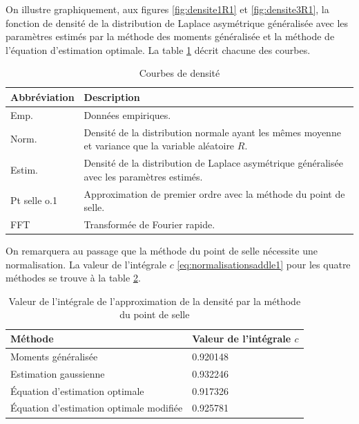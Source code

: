 On illustre graphiquement, aux figures \ref{fig:densite1R1} et
\ref{fig:densite3R1}, la fonction de densité de la distribution de
Laplace asymétrique généralisée avec les paramètres estimés par la
méthode des moments généralisée et la méthode de l'équation
d'estimation optimale. La table \ref{tab:courbesdensite} décrit
chacune des courbes.
\begin{table}[!ht]
  \centering
  \begin{tabular}{lp{12cm}}
    \hline
    \textbf{Abbréviation} & \textbf{Description} \\
    \hline
    Emp. & Données empiriques. \\
    Norm. & Densité de la distribution normale ayant les mêmes moyenne et variance que la variable aléatoire $R$. \\
    Estim. & Densité de la distribution de Laplace asymétrique généralisée avec les paramètres estimés.\\
    Pt selle o.1 & Approximation de premier ordre avec la méthode du point de selle. \\
    FFT & Transformée de Fourier rapide. \\
    \hline
  \end{tabular}
  \caption{Courbes de densité}
  \label{tab:courbesdensite}
\end{table}

On remarquera au passage que la méthode du point de selle nécessite
une normalisation. La valeur de l'intégrale $c$
\eqref{eq:normalisationsaddle1} pour les quatre méthodes se trouve à
la table \ref{tab:intapproxpointselleR1}.
\begin{table}[!ht]
  \centering
  \begin{tabular}{ll}
    \hline
    \textbf{Méthode} & \textbf{Valeur de l'intégrale $c$}\\
    \hline
    Moments généralisée & 0.920148 \\
    Estimation gaussienne & 0.932246 \\
    Équation d'estimation optimale & 0.917326 \\
    Équation d'estimation optimale modifiée & 0.925781 \\
    \hline
  \end{tabular}
  \caption{Valeur de l'intégrale de l'approximation de la densité par la méthode du point de selle }
  \label{tab:intapproxpointselleR1}
\end{table}

